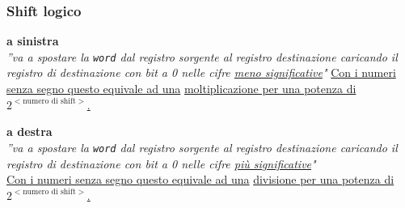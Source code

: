 \documentclass[../main.tex]{subfiles}
\begin{document}
\subsubsection{Shift logico}
\vspace*{-4mm}
\begin{table}[h!]
    \begin{minipage}{.02\linewidth}
        \hspace*{0cm}
    \end{minipage}
    \begin{minipage}{.45\linewidth}
        \textbf{a sinistra} \\
        \textit{''va a spostare la \texttt{word} dal registro sorgente al registro
        destinazione caricando il registro di destinazione
        con bit a 0 nelle cifre \underline{meno significative}"}
        \underline{Con i numeri senza segno questo equivale ad una}
        \underline{moltiplicazione per una potenza di
        $2^{{<\text{numero di shift}>}}$.}

        \vspace*{3mm}

        \centering

    \end{minipage}
    \begin{minipage}{.08\linewidth}
        \hspace*{0cm}
    \end{minipage}
    \begin{minipage}{.45\linewidth}
        \textbf{a destra} \\
        \textit{''va a spostare la \texttt{word} dal registro sorgente al registro
        destinazione caricando il registro di destinazione
        con bit a 0 nelle cifre \underline{più significative}"} \\
        \underline{Con i numeri senza segno questo equivale ad una}
        \underline{divisione per una potenza di
        $2^{{<\text{numero di shift}>}}$.}


\end{minipage}
\end{table}
\end{document}
